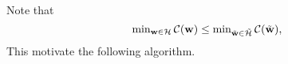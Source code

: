 \documentclass[12pt,hidelinks]{article}
\begin{document}
Note that
\begin{equation}
  \min\nolimits_{\mathbf{w} \in\mathcal{H}}{{\cal C}}(\mathbf{w})
  \le \min\nolimits_{\tilde{\mathbf{w}} \in\mathcal{\tilde{H}}}{{\cal C}}(\tilde{\mathbf{w}}),
\end{equation}
This motivate the following algorithm.
\end{document}
